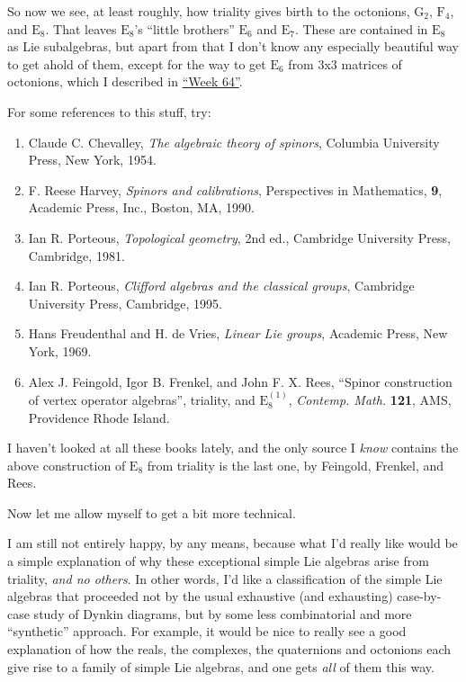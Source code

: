 \documentclass{article}
\begin{document}
So now we see, at least roughly, how triality gives birth to the
octonions, \(\mathrm{G}_2\), \(\mathrm{F}_4\), and \(\mathrm{E}_8\).
That leaves \(\mathrm{E}_8\)'s ``little brothers'' \(\mathrm{E}_6\) and
\(\mathrm{E}_7\). These are contained in \(\mathrm{E}_8\) as Lie
subalgebras, but apart from that I don't know any especially beautiful
way to get ahold of them, except for the way to get \(\mathrm{E}_6\)
from 3x3 matrices of octonions, which I described in
\protect\hyperlink{week64}{``Week 64''}.

For some references to this stuff, try:

\begin{enumerate}
\def\labelenumi{\arabic{enumi})}
\item
  Claude C. Chevalley, \emph{The algebraic theory of spinors}, Columbia
  University Press, New York, 1954.
\item
  F. Reese Harvey, \emph{Spinors and calibrations}, Perspectives in
  Mathematics, \textbf{9}, Academic Press, Inc., Boston, MA, 1990.
\item
  Ian R. Porteous, \emph{Topological geometry}, 2nd ed., Cambridge
  University Press, Cambridge, 1981.
\item
  Ian R. Porteous, \emph{Clifford algebras and the classical groups},
  Cambridge University Press, Cambridge, 1995.
\item
  Hans Freudenthal and H. de Vries, \emph{Linear Lie groups}, Academic
  Press, New York, 1969.
\item
  Alex J. Feingold, Igor B. Frenkel, and John F. X. Rees, ``Spinor
  construction of vertex operator algebras'', triality, and
  \(\mathrm{E}_8^{(1)}\), \emph{Contemp. Math.} \textbf{121}, AMS,
  Providence Rhode Island.
\end{enumerate}

I haven't looked at all these books lately, and the only source I
\emph{know} contains the above construction of \(\mathrm{E}_8\) from
triality is the last one, by Feingold, Frenkel, and Rees.

Now let me allow myself to get a bit more technical.

I am still not entirely happy, by any means, because what I'd really
like would be a simple explanation of why these exceptional simple Lie
algebras arise from triality, \emph{and no others}. In other words, I'd
like a classification of the simple Lie algebras that proceeded not by
the usual exhaustive (and exhausting) case-by-case study of Dynkin
diagrams, but by some less combinatorial and more ``synthetic''
approach. For example, it would be nice to really see a good explanation
of how the reals, the complexes, the quaternions and octonions each give
rise to a family of simple Lie algebras, and one gets \emph{all} of them
this way.
\end{document}
